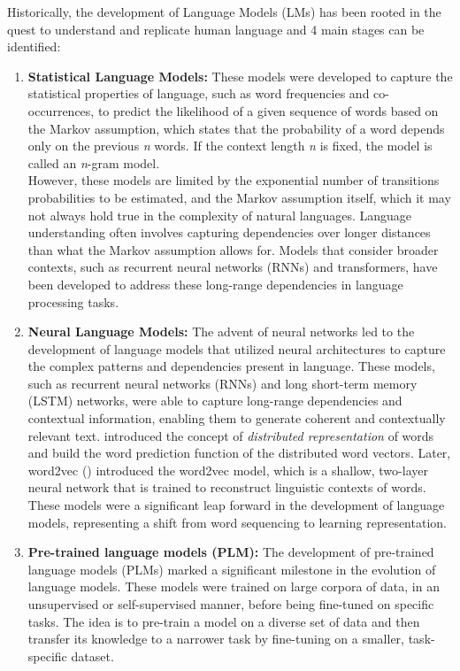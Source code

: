 Historically, the development of Language Models (LMs) has been rooted in the quest to understand and replicate human language and 4 main stages can be identified:
\begin{enumerate}
	\item \textbf{Statistical Language Models:} {These models were developed to capture the statistical properties of language, such as word frequencies and co-occurrences, to predict the likelihood of a given sequence of words based on the Markov assumption, which states that the probability of a word depends only on the previous \textit{n} words.
		      If the context length \textit{n} is fixed, the model is called an \textit{n}-gram model.\\
		      However, these models are limited by the exponential number of transitions probabilities to be estimated, and the Markov assumption itself, which it may not always hold true in the complexity of natural languages.
		      Language understanding often involves capturing dependencies over longer distances than what the Markov assumption allows for. Models that consider broader contexts, such as recurrent neural networks (RNNs) and transformers, have been developed to address these long-range dependencies in language processing tasks.}
	\item \textbf{Neural Language Models:} {The advent of neural networks led to the development of language models that utilized neural architectures to capture the complex patterns and dependencies present in language.
		      These models, such as recurrent neural networks (RNNs) and long short-term memory (LSTM) networks, were able to capture long-range dependencies and contextual information, enabling them to generate coherent and contextually relevant text.
		      \textcite{nlm} introduced the concept of \textit{distributed representation} of words and build the word prediction function of the distributed word vectors.
		      Later, word2vec (\textcite{word2vec, word2vec2}) introduced the word2vec model, which is a shallow, two-layer neural network that is trained to reconstruct linguistic contexts of words.
		      These models were a significant leap forward in the development of language models, representing a shift from word sequencing to learning representation.}
	\item \textbf{Pre-trained language models (PLM):} {The development of pre-trained language models (PLMs) marked a significant milestone in the evolution of language models.
		      These models were trained on large corpora of data, in an unsupervised or self-supervised manner, before being fine-tuned on specific tasks. The idea is to pre-train a model on a diverse set of data and then transfer its knowledge to a narrower task by fine-tuning on a smaller, task-specific dataset.
}
\end{enumerate}
